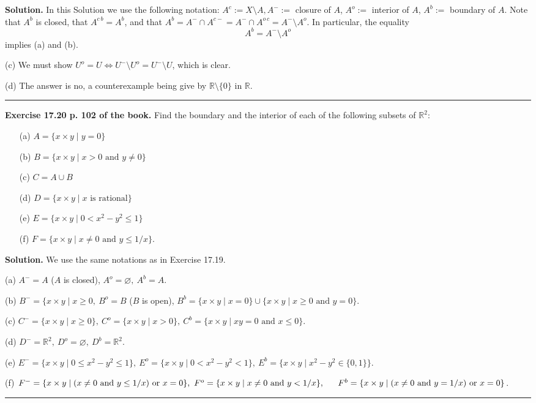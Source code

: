 \documentclass[12pt,letterpaper]{article}
\newcommand{\hs}{\bigskip\hrule\medskip}
\newcommand{\noi}{\noindent}%
\newcommand{\sm}{\setminus}
\newcommand{\R}{\mathbb R}
\begin{document}
\noi\textbf{Solution.} In this Solution we use the following notation: $A^c:=X\sm A,A^-:=$ closure of $A$, $A^o:=$ interior of $A$, $A^b:=$ boundary of $A$. Note that $A^b$ is closed, that $A^{c\,b}=A^b$, and that $A^b=A^-\cap A^{c-}=A^-\cap A^{o\,c}=A^-\sm A^o$. In particular, the equality 
$$
A^b=A^-\sm A^o
$$ 
implies (a) and (b). 

\noi(c) We must show $U^o=U\Leftrightarrow U^-\sm U^o=U^-\sm U$, which is clear. 

\noi(d) The answer is no, a counterexample being give by $\R\sm\{0\}$ in $\R$. 

\hs

\noi\textbf{Exercise 17.20 p. 102 of the book.} Find the boundary and the interior of each of the following subsets of $\mathbb{R}^{2}$:
\begin{enumerate}
    \item[(a)] $A=\{x\times y\mid y=0\}$
    \item[(b)] $B=\{x\times y\mid x>0\text{ and }y\ne0\}$
    \item[(c)] $C=A\cup B$
    \item[(d)] $D=\{x\times y\mid x\text{ is rational}\}$
    \item[(e)] $E=\{x\times y\mid 0<x^2-y^2\le1\}$
    \item[(f)] $F=\{x\times y\mid x\ne0\text{ and }y\leq1/x\}$. 
\end{enumerate}

\noi\textbf{Solution.} We use the same notations as in Exercise 17.19. 

\noi(a) $A^-=A$ ($A$ is closed), $A^o=\varnothing,\ A^b=A$. 

\noi(b) $B^-=\{x\times y\mid x\ge0,\ B^o=B$ ($B$ is open), $B^b=\{x\times y\mid x=0\}\cup\{x\times y\mid x\ge0\text{ and }y=0\}$. 

\noi(c) $C^-=\{x\times y\mid x\ge0\},\ C^o=\{x\times y\mid x>0\},\ C^b=\{x\times y\mid xy=0\text{ and }x\le0\}$. 

\noi(d) $D^-=\R^2,\ D^o=\varnothing,\ D^b=\R^2$. 

\noi(e) $E^-=\{x\times y\mid 0\le x^2-y^2\le1\},\ E^o=\{x\times y\mid 0<x^2-y^2<1\},\ E^b=\{x\times y\mid x^2-y^2\in\{0,1\}\}$. 

\noi(f) $F^-=\{x\times y\mid(x\neq 0\text{ and }y\leq1/x)\text{ or }x=0\},\ F^o=\{x\times y\mid x\neq 0\text{ and }y<1/x\},\\{}\hskip16pt F^b=\{x\times y\mid(x\neq 0\text{ and }y=1/x)\text{ or }x=0\}$. 

\hs 
\end{document}
